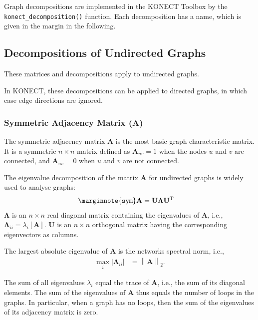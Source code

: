 \documentclass{article}
\begin{document}
Graph decompositions are implemented in the KONECT Toolbox by the
\texttt{konect\_decomposition()} function.  Each decomposition has a
name, which is given in the margin in the following. 

\subsection{Decompositions of Undirected Graphs}
These matrices and decompositions apply to undirected graphs.

In KONECT, these decompositions can be applied to directed graphs, in
which case edge directions are ignored. 

\subsubsection{Symmetric Adjacency Matrix ($\mathbf A$)}
The symmetric adjacency matrix $\mathbf A$ is the most basic graph
characteristic matrix.  It is a symmetric $n \times n$ matrix defined as
$\mathbf A_{uv}=1$ when the nodes $u$ and $v$ are connected, and
$\mathbf A_{uv}=0$ when $u$ and $v$ are not connected. 

The eigenvalue decomposition of the matrix $\mathbf A$ for undirected
graphs is widely used to analyse graphs: 
\begin{align}
  \marginnote{\texttt{sym}}
  \mathbf A &= \mathbf U \mathbf \Lambda \mathbf U^{\mathrm T}
\end{align}
$\mathbf \Lambda$ is an $n \times n$ real diagonal matrix containing the
eigenvalues of $\mathbf A$, i.e., $\mathbf \Lambda_{ii} =
\lambda_i[\mathbf A]$.  
$\mathbf U$ is an $n \times n$ orthogonal matrix having the
corresponding eigenvectors as columns. 

The largest absolute eigenvalue of $\mathbf A$ is the networks spectral norm,
i.e.,
\begin{align*}
  \max_i |\mathbf \Lambda_{ii}| &= \left\| \mathbf A \right\|_2.
\end{align*}

The sum of all eigenvalues $\lambda_i$ equal the trace of $\mathbf A$,
i.e., the sum of its diagonal elements.  The sum of the eigenvalues of
$\mathbf A$ thus equals the number of loops in the graphs. 
In particular, when a graph
has no loops, then the sum of the eigenvalues of its adjacency matrix is
zero.  
\end{document}
